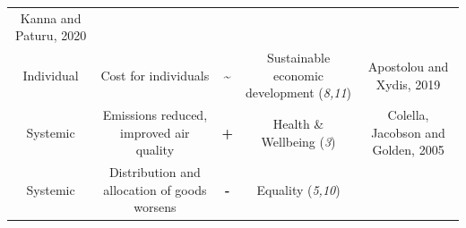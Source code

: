 \documentclass[
]{book}
\begin{document}
\begin{longtable}[]{@{}ccccc@{}}
\begin{minipage}[t]{0.17\columnwidth}
Kanna and Paturu, 2020\strut
\end{minipage}\tabularnewline
\begin{minipage}[t]{0.17\columnwidth}\centering
Individual\strut
\end{minipage} & \begin{minipage}[t]{0.16\columnwidth}\centering
Cost for individuals\strut
\end{minipage} & \begin{minipage}[t]{0.17\columnwidth}\centering
\textbf{\textasciitilde{}}\strut
\end{minipage} & \begin{minipage}[t]{0.17\columnwidth}\centering
Sustainable economic development (\emph{8,11})\strut
\end{minipage} & \begin{minipage}[t]{0.17\columnwidth}\centering
Apostolou and Xydis, 2019\strut
\end{minipage}\tabularnewline
\begin{minipage}[t]{0.17\columnwidth}\centering
Systemic\strut
\end{minipage} & \begin{minipage}[t]{0.16\columnwidth}\centering
Emissions reduced, improved air quality\strut
\end{minipage} & \begin{minipage}[t]{0.17\columnwidth}\centering
\textbf{+}\strut
\end{minipage} & \begin{minipage}[t]{0.17\columnwidth}\centering
Health \& Wellbeing (\emph{3})\strut
\end{minipage} & \begin{minipage}[t]{0.17\columnwidth}\centering
Colella, Jacobson and Golden, 2005\strut
\end{minipage}\tabularnewline
\begin{minipage}[t]{0.17\columnwidth}\centering
Systemic\strut
\end{minipage} & \begin{minipage}[t]{0.16\columnwidth}\centering
Distribution and allocation of goods worsens\strut
\end{minipage} & \begin{minipage}[t]{0.17\columnwidth}\centering
\textbf{-}\strut
\end{minipage} & \begin{minipage}[t]{0.17\columnwidth}\centering
Equality (\emph{5,10})\strut
\end{minipage} & \begin{minipage}[t]{0.17\columnwidth}\centering

\end{minipage}
\end{longtable}
\end{document}
